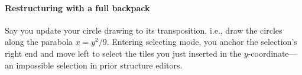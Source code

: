 


\paragraph{Restructuring with a full backpack}
Say you update your circle drawing
to its transposition, i.e., draw the circles along
the parabola $x = y^2/9$.
Entering selecting mode, you anchor the selection's right
end and move left to select the tiles you just
inserted in the $y$-coordinate---an impossible
selection in prior structure editors.

